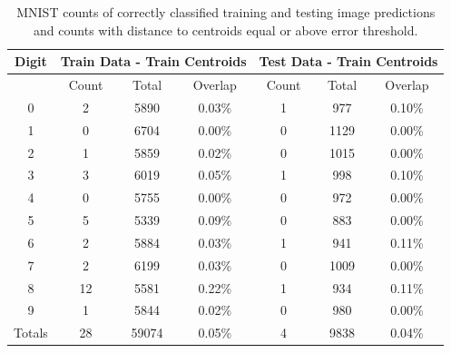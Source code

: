 \begin{table}[htbp]
\centering
\begin{tabular}{|c|c|c|c|c|c|c|}
\hline
Digit & \multicolumn{3}{c|}{Train Data - Train Centroids} & \multicolumn{3}{c|}{Test Data - Train Centroids} \\
\hline
 & Count & Total & Overlap & Count & Total & Overlap \\
\hline
0 & 2 & 5890 & 0.03\% & 1 & 977 & 0.10\% \\
1 & 0 & 6704 & 0.00\% & 0 & 1129 & 0.00\% \\
2 & 1 & 5859 & 0.02\% & 0 & 1015 & 0.00\% \\
3 & 3 & 6019 & 0.05\% & 1 & 998 & 0.10\% \\
4 & 0 & 5755 & 0.00\% & 0 & 972 & 0.00\% \\
5 & 5 & 5339 & 0.09\% & 0 & 883 & 0.00\% \\
6 & 2 & 5884 & 0.03\% & 1 & 941 & 0.11\% \\
7 & 2 & 6199 & 0.03\% & 0 & 1009 & 0.00\% \\
8 & 12 & 5581 & 0.22\% & 1 & 934 & 0.11\% \\
9 & 1 & 5844 & 0.02\% & 0 & 980 & 0.00\% \\
\hline
Totals & 28 & 59074 & 0.05\% & 4 & 9838 & 0.04\% \\
\hline
\end{tabular}
\caption{MNIST counts of correctly classified training and testing image predictions and counts with distance to centroids equal or above error threshold.}
\label{tab:centroid_distance_overlap_mnist}
\end{table}

